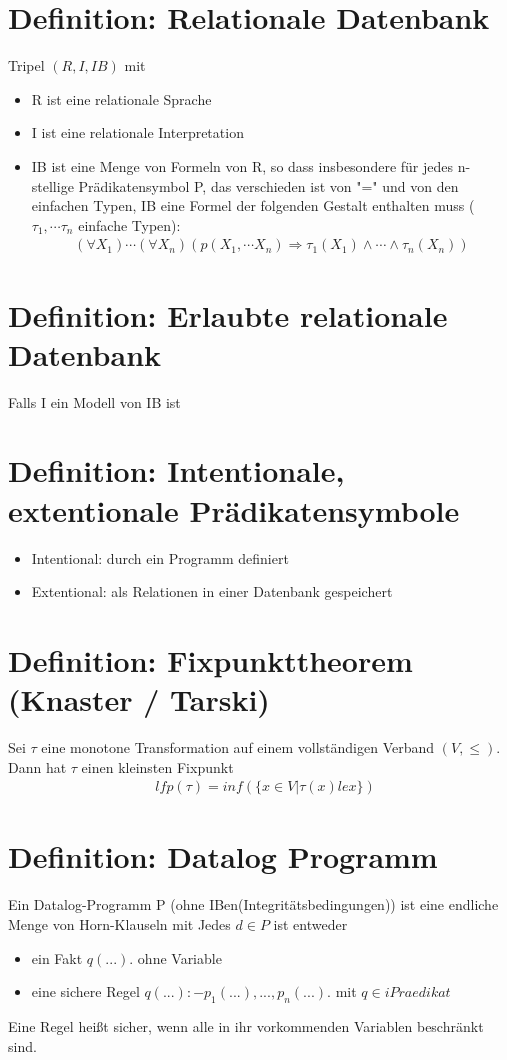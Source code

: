 \documentclass[12pt, a4paper]{article}
\begin{document}
\section*{Definition: Relationale Datenbank}
Tripel $(R, I, IB)$ mit
\begin{itemize}
	\item R ist eine relationale Sprache
	\item I ist eine relationale Interpretation
	\item IB ist eine Menge von Formeln von R, so dass insbesondere für jedes n- stellige Prädikatensymbol P, das verschieden ist von "=" und von den einfachen Typen, IB eine Formel der folgenden Gestalt enthalten muss ($\tau_1, \cdots \tau_n$ einfache Typen):
	\begin{align*}
	(\forall X_1) \cdots (\forall X_n) (p(X_1, \cdots X_n) \Rightarrow \tau_1(X_1) \wedge \cdots \wedge \tau_n(X_n))
	\end{align*}
\end{itemize}

\section*{Definition: Erlaubte relationale Datenbank}
Falls I ein Modell von IB ist

\section*{Definition: Intentionale, extentionale Prädikatensymbole}
\begin{itemize}
	\item Intentional: durch ein Programm definiert
	\item Extentional:  als Relationen in einer Datenbank gespeichert
\end{itemize}

\section*{Definition: Fixpunkttheorem (Knaster / Tarski)}
Sei $\tau$ eine monotone Transformation auf einem vollständigen Verband $(V, \le)$. Dann hat $\tau$ einen kleinsten Fixpunkt 
\begin{align*}
&lfp(\tau) = inf(\{ x \in V | \tau(x) le x \})
\end{align*}

\section*{Definition: Datalog Programm}
Ein Datalog-Programm P (ohne IBen(Integritätsbedingungen)) ist eine endliche Menge von Horn-Klauseln mit Jedes $d \in P$ ist entweder
\begin{itemize}
\item ein Fakt $q(...).$ ohne Variable
\item eine sichere Regel $q(...) :- p_1(...),...,p_n(...).$ mit $q\in iPraedikat$
\end{itemize}
Eine Regel heißt sicher, wenn alle in ihr vorkommenden Variablen beschränkt sind.
\end{document}
